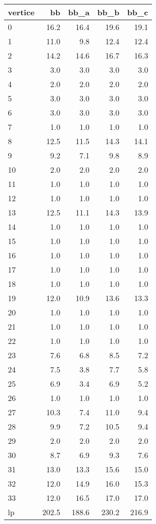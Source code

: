 \begin{tabular}{lrrrr}
\toprule
vertice & bb & bb_a & bb_b & bb_c \\
\midrule
0 & 16.2 & 16.4 & 19.6 & 19.1 \\
1 & 11.0 & 9.8 & 12.4 & 12.4 \\
2 & 14.2 & 14.6 & 16.7 & 16.3 \\
3 & 3.0 & 3.0 & 3.0 & 3.0 \\
4 & 2.0 & 2.0 & 2.0 & 2.0 \\
5 & 3.0 & 3.0 & 3.0 & 3.0 \\
6 & 3.0 & 3.0 & 3.0 & 3.0 \\
7 & 1.0 & 1.0 & 1.0 & 1.0 \\
8 & 12.5 & 11.5 & 14.3 & 14.1 \\
9 & 9.2 & 7.1 & 9.8 & 8.9 \\
10 & 2.0 & 2.0 & 2.0 & 2.0 \\
11 & 1.0 & 1.0 & 1.0 & 1.0 \\
12 & 1.0 & 1.0 & 1.0 & 1.0 \\
13 & 12.5 & 11.1 & 14.3 & 13.9 \\
14 & 1.0 & 1.0 & 1.0 & 1.0 \\
15 & 1.0 & 1.0 & 1.0 & 1.0 \\
16 & 1.0 & 1.0 & 1.0 & 1.0 \\
17 & 1.0 & 1.0 & 1.0 & 1.0 \\
18 & 1.0 & 1.0 & 1.0 & 1.0 \\
19 & 12.0 & 10.9 & 13.6 & 13.3 \\
20 & 1.0 & 1.0 & 1.0 & 1.0 \\
21 & 1.0 & 1.0 & 1.0 & 1.0 \\
22 & 1.0 & 1.0 & 1.0 & 1.0 \\
23 & 7.6 & 6.8 & 8.5 & 7.2 \\
24 & 7.5 & 3.8 & 7.7 & 5.8 \\
25 & 6.9 & 3.4 & 6.9 & 5.2 \\
26 & 1.0 & 1.0 & 1.0 & 1.0 \\
27 & 10.3 & 7.4 & 11.0 & 9.4 \\
28 & 9.9 & 7.2 & 10.5 & 9.4 \\
29 & 2.0 & 2.0 & 2.0 & 2.0 \\
30 & 8.7 & 6.9 & 9.3 & 7.6 \\
31 & 13.0 & 13.3 & 15.6 & 15.0 \\
32 & 12.0 & 14.9 & 16.0 & 15.3 \\
33 & 12.0 & 16.5 & 17.0 & 17.0 \\
lp & 202.5 & 188.6 & 230.2 & 216.9 \\
\bottomrule
\end{tabular}
